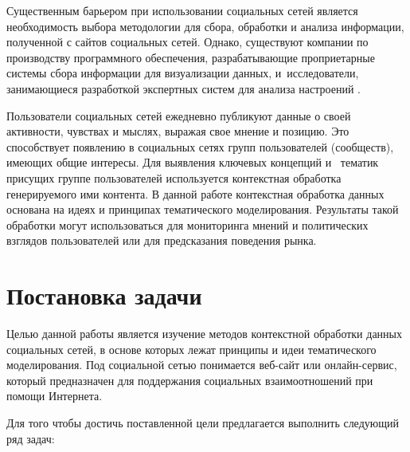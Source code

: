 \documentclass[a4paper]{report}
\begin{document}
	Существенным барьером при использовании социальных сетей является необходимость выбора методологии для сбора, обработки и анализа информации, полученной с сайтов социальных сетей. Однако, существуют компании по производству программного обеспечения, разрабатывающие проприетарные системы сбора информации для визуализации данных, и~исследователи, занимающиеся разработкой экспертных систем для анализа настроений \cite{bib:Kaklauskas}. 
	
Пользователи социальных сетей ежедневно публикуют данные о своей активности, чувствах и мыслях, выражая свое мнение и позицию. Это способствует появлению в социальных сетях групп пользователей (сообществ), имеющих общие интересы. Для выявления ключевых концепций и~ тематик присущих группе пользователей используется контекстная обработка  генерируемого ими контента. В данной работе контекстная обработка данных основана на идеях и принципах тематического моделирования. Результаты такой обработки могут использоваться для мониторинга мнений и политических взглядов пользователей или для предсказания поведения рынка. \\

	 
	\section{Постановка задачи}
	Целью данной работы является изучение методов контекстной обработки данных социальных сетей, в основе которых лежат принципы и идеи тематического моделирования. Под социальной сетью понимается веб-сайт или онлайн-сервис, который предназначен для поддержания социальных взаимоотношений при помощи Интернета. 
	
	 Для того чтобы достичь поставленной цели предлагается выполнить следующий ряд задач:
	
	
	\renewcommand{\labelenumi}{\arabic{enumi}.}
	\renewcommand{\labelenumii}{\arabic{enumi}.\arabic{enumii}}
\end{document}

